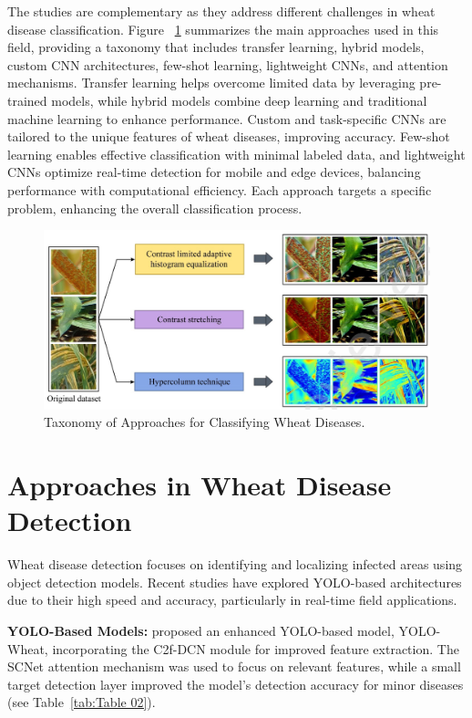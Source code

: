 The studies are complementary as they address different challenges in wheat disease classification. Figure ~\ref{fig:Figure01} summarizes the main approaches used in this field, providing a taxonomy that includes transfer learning, hybrid models, custom CNN architectures, few-shot learning, lightweight CNNs, and attention mechanisms. Transfer learning helps overcome limited data by leveraging pre-trained models, while hybrid models combine deep learning and traditional machine learning to enhance performance. Custom and task-specific CNNs are tailored to the unique features of wheat diseases, improving accuracy. Few-shot learning enables effective classification with minimal labeled data, and lightweight CNNs optimize real-time detection for mobile and edge devices, balancing performance with computational efficiency. Each approach targets a specific problem, enhancing the overall classification process.    

\begin{figure}[H]
    \centering
    \includegraphics[width=1.0\textwidth]{chapters/chapter3/images/Figure01.png}
    \caption{Taxonomy of Approaches for Classifying Wheat Diseases. \protect\parencite{haider2021wheat}}
    \label{fig:Figure01}
\end{figure}



\section{Approaches in Wheat Disease Detection}

Wheat disease detection focuses on identifying and localizing infected areas using object detection models. Recent studies have explored YOLO-based architectures due to their high speed and accuracy, particularly in real-time field applications.

\textbf{YOLO-Based Models:} \parencite{yao2024yolo} proposed an enhanced YOLO-based model, YOLO-Wheat, incorporating the C2f-DCN module for improved feature extraction. The SCNet attention mechanism was used to focus on relevant features, while a small target detection layer improved the model's detection accuracy for minor diseases (see Table~\ref{tab:Table 02}).

